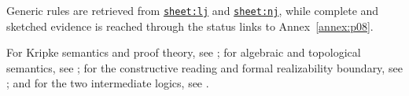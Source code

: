 Generic rules are retrieved from
\hyperref[sheet:lj]{\texttt{sheet:lj}} and
\hyperref[sheet:nj]{\texttt{sheet:nj}}, while complete and sketched evidence
is reached through the status links to Annex~\ref{annex:p08}.

For Kripke semantics and proof theory, see
\cite{Kripke1965,TroelstraSchwichtenberg2000,TroelstraVanDalen1988}; for
algebraic and topological semantics, see
\cite{RasiowaSikorski1963,McKinseyTarski1946}; for the constructive reading and
formal realizability boundary, see
\cite{Brouwer1908,Heyting1956,Kleene1945}; and for the two intermediate logics,
see \cite{Jankov1968WeakExcludedMiddle,Dummett1959}.
